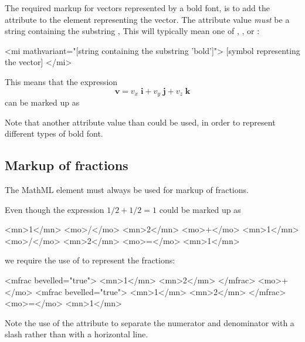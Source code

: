 \documentclass[english,a4paper,11pt]{article}
\begin{document}
\medskip The required markup for vectors represented by a bold font, is to add the  attribute to the  element representing the vector. The attribute value \emph{must} be a string containing the substring , This will typically mean one of , ,  or :
\begin{kodeblokk}
\begin{verbatimtab}[3]
<mi mathvariant="[string containing the substring 'bold']">
	[symbol representing the vector]
</mi>
\end{verbatimtab}
\end{kodeblokk}
This means that the expression
\[
\mathbf{v} = v_x\;  \mathbf{i} + v_y\; \mathbf{j} + v_z\;  \mathbf{k}
\]
can be marked up as
\begin{kodeblokk}
\end{kodeblokk}
Note that another attribute value than  could be used, in order to represent different types of bold font.

\innholdNyttBlokkSlutt
\subsection{Markup of fractions}
The MathML element  must always be used for markup of fractions.

Even though the expression $1/2 + 1/2 =1$ could be marked up as
\begin{kodeblokk}
\begin{verbatimtab}[3]
<mn>1</mn>
<mo>/</mo>
<mn>2</mn>
<mo>+</mo>
<mn>1</mn>
<mo>/</mo>
<mn>2</mn>
<mo>=</mo>
<mn>1</mn>
\end{verbatimtab}
\end{kodeblokk}
we require the use of  to represent the fractions:
\begin{kodeblokk}
\begin{verbatimtab}[3]
<mfrac bevelled="true">
	<mn>1</mn>
	<mn>2</mn>
</mfrac>
<mo>+</mo>
<mfrac bevelled="true">
	<mn>1</mn>
	<mn>2</mn>
</mfrac>
<mo>=</mo>
<mn>1</mn>
\end{verbatimtab}
\end{kodeblokk}
Note the use of the  attribute to separate the numerator and denominator  with a slash rather than with a horizontal line.
\end{document}
